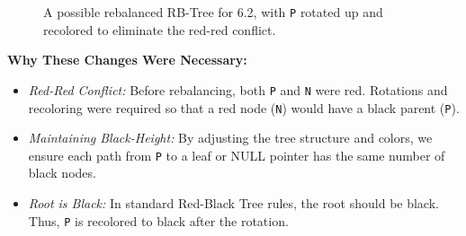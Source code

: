 \documentclass[11pt]{article}
\begin{document}
	\begin{figure}[h!]
		\centering
		\caption{A possible rebalanced RB-Tree for 6.2, with \texttt{P} rotated up and recolored to eliminate the red-red conflict.}
		\label{fig:RBtree62}
	\end{figure}
	
	\noindent
	\textbf{Why These Changes Were Necessary:}
	\begin{itemize}
		\item \textit{Red-Red Conflict:} Before rebalancing, both \texttt{P} and \texttt{N} were red. Rotations and recoloring were required so that a red node (\texttt{N}) would have a black parent (\texttt{P}).
		\item \textit{Maintaining Black-Height:} By adjusting the tree structure and colors, we ensure each path from \texttt{P} to a leaf or NULL pointer has the same number of black nodes.
		\item \textit{Root is Black:} In standard Red-Black Tree rules, the root should be black. Thus, \texttt{P} is recolored to black after the rotation.
	\end{itemize}
	
	
\end{document}
